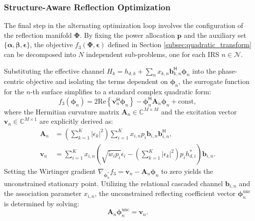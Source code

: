 \documentclass[journal]{IEEEtran}
\newcommand{\herm}{^{\mathsf{H}}}
\begin{document}
\subsubsection{Structure-Aware Reflection Optimization}
\label{subsubsec:reflection_optimization}

The final step in the alternating optimization loop involves the configuration of the reflection manifold $\boldsymbol{\Phi}$. By fixing the power allocation $\mathbf{p}$ and the auxiliary set $\{\boldsymbol{\alpha}, \boldsymbol{\beta}, \boldsymbol{\epsilon}\}$, the objective $f_3(\boldsymbol{\Phi}, \boldsymbol{\epsilon})$ defined in Section \ref{subsec:quadratic_transform} can be decomposed into $N$ independent sub-problems, one for each IRS $n \in \mathcal{N}$. 

Substituting the effective channel $H_k = h_{d,k} + \sum_n x_{k,n} \mathbf{b}_{k,n}\herm \boldsymbol{\phi}_n$ into the phase-centric objective and isolating the terms dependent on $\boldsymbol{\phi}_n$, the surrogate function for the $n$-th surface simplifies to a standard complex quadratic form:
\begin{equation}
    f_3(\boldsymbol{\phi}_n) = 2 \text{Re} \left\{ \mathbf{v}_n\herm \boldsymbol{\phi}_n \right\} - \boldsymbol{\phi}_n\herm \mathbf{A}_n \boldsymbol{\phi}_n + \text{const},
\end{equation}
where the Hermitian curvature matrix $\mathbf{A}_n \in \mathbb{C}^{M \times M}$ and the excitation vector $\mathbf{v}_n \in \mathbb{C}^{M \times 1}$ are explicitly derived as:
\begin{align}
    \mathbf{A}_n &= \left( \sum_{k=1}^K |\epsilon_k|^2 \right) \sum_{i=1}^K x_{i,n} p_i \mathbf{b}_{i,n} \mathbf{b}_{i,n}\herm, \\
    \mathbf{v}_n &= \sum_{i=1}^K x_{i,n} \left( \sqrt{\tilde{w}_i p_i} \epsilon_i - \left( \sum_{k=1}^K |\epsilon_k|^2 \right) p_i h_{d,i}^* \right) \mathbf{b}_{i,n}.
\end{align}
Setting the Wirtinger gradient $\nabla_{\boldsymbol{\phi}_n^*} f_3 = \mathbf{v}_n - \mathbf{A}_n \boldsymbol{\phi}_n$ to zero yields the unconstrained stationary point. Utilizing the relational cascaded channel $\mathbf{b}_{i,n}$ and the association parameter $x_{i,n}$, the unconstrained reflecting coefficient vector $\boldsymbol{\phi}_n^{\text{unc}}$ is determined by solving:
\begin{equation}
    \mathbf{A}_n \boldsymbol{\phi}_n^{\text{unc}} = \mathbf{v}_n.
    \label{eq:matrix_system}
\end{equation}
\end{document}
